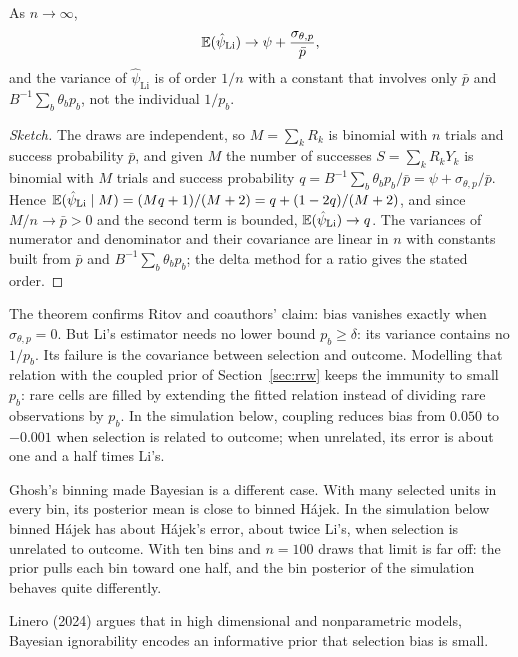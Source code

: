 \begin{theorem}
As $n \to \infty$,
\[
\mathbb{E}(\hat\psi_{\mathrm{Li}}) \to \psi + \frac{\sigma_{\theta,p}}{\bar p},
\]
and the variance of $\hat\psi_{\mathrm{Li}}$ is of order $1/n$ with a constant that involves only $\bar p$ and $B^{-1}\sum_b\theta_bp_b$, not the individual $1/p_b$.
\end{theorem}

\begin{proof}[Sketch]
The draws are independent, so $M = \sum_k R_k$ is binomial with $n$ trials and success probability $\bar p$, and given $M$ the number of successes $S = \sum_k R_kY_k$ is binomial with $M$ trials and success probability $q = B^{-1}\sum_b\theta_bp_b/\bar p = \psi + \sigma_{\theta,p}/\bar p$. Hence $\mathbb{E}(\hat\psi_{\mathrm{Li}} \mid M) = (Mq + 1)/(M + 2) = q + (1 - 2q)/(M + 2)$, and since $M/n \to \bar p > 0$ and the second term is bounded, $\mathbb{E}(\hat\psi_{\mathrm{Li}}) \to q$. The variances of numerator and denominator and their covariance are linear in $n$ with constants built from $\bar p$ and $B^{-1}\sum_b\theta_bp_b$; the delta method for a ratio gives the stated order.
\end{proof}

The theorem confirms Ritov and coauthors' claim: bias vanishes exactly when $\sigma_{\theta,p} = 0$. But Li's estimator needs no lower bound $p_b \geq \delta$: its variance contains no $1/p_b$. Its failure is the covariance between selection and outcome. Modelling that relation with the coupled prior of Section~\ref{sec:rrw} keeps the immunity to small $p_b$: rare cells are filled by extending the fitted relation instead of dividing rare observations by $p_b$. In the simulation below, coupling reduces bias from $0.050$ to $-0.001$ when selection is related to outcome; when unrelated, its error is about one and a half times Li's.

Ghosh's binning made Bayesian is a different case. With many selected units in every bin, its posterior mean is close to binned H\'ajek. In the simulation below binned H\'ajek has about H\'ajek's error, about twice Li's, when selection is unrelated to outcome. With ten bins and $n = 100$ draws that limit is far off: the prior pulls each bin toward one half, and the bin posterior of the simulation behaves quite differently.

Linero (2024) argues that in high dimensional and nonparametric models, Bayesian ignorability encodes an informative prior that selection bias is small.

